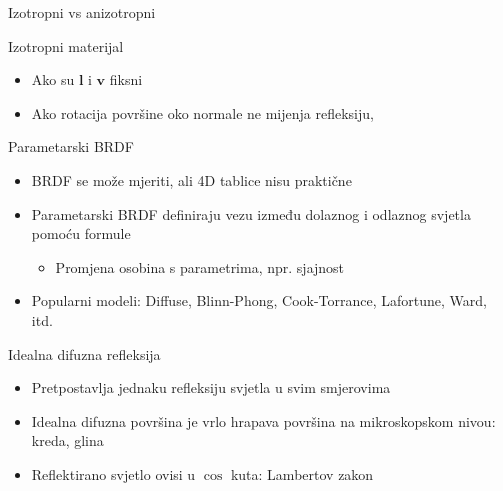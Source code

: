 \documentclass[9pt]{beamer}
\begin{document}
\begin{frame}{Izotropni vs anizotropni}
	\begin{block}{Izotropni materijal}
		\begin{itemize} %
			\item Ako su $\mathbf{l}$ i $\mathbf{v}$ fiksni 
			\item Ako rotacija površine oko normale ne mijenja refleksiju,
		\end{itemize}
	\end{block}	
\end{frame}

\begin{frame}{Parametarski BRDF}
	\begin{itemize} %
		\item BRDF se može mjeriti, ali 4D tablice nisu praktične
		\item Parametarski BRDF definiraju vezu između dolaznog i odlaznog svjetla pomoću formule
		\begin{itemize} %
			\item Promjena osobina s parametrima, npr. sjajnost
		\end{itemize}
		\item Popularni modeli: Diffuse, Blinn-Phong, Cook-Torrance, Lafortune, Ward, itd.
	\end{itemize}
\end{frame}

\begin{frame}{Idealna difuzna refleksija}
	\begin{itemize} %
		\item Pretpostavlja jednaku refleksiju svjetla u svim smjerovima
		\item Idealna difuzna površina je vrlo hrapava površina na mikroskopskom nivou: kreda, glina
		\item Reflektirano svjetlo ovisi u $\cos$ kuta: Lambertov zakon
	\end{itemize}
\end{frame}
\end{document}
